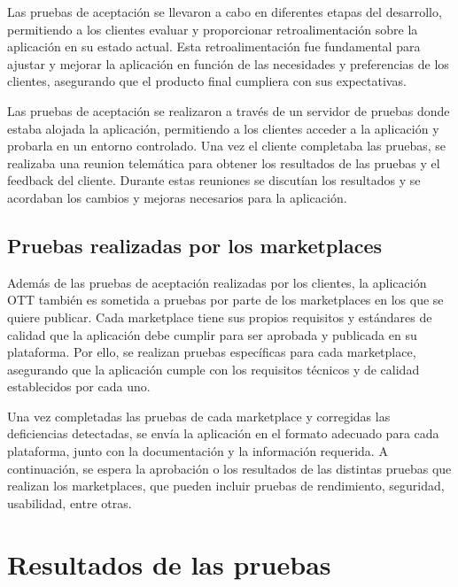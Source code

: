 Las pruebas de aceptación se llevaron a cabo en diferentes etapas del desarrollo, permitiendo a los clientes evaluar y
proporcionar retroalimentación sobre la aplicación en su estado actual. Esta retroalimentación fue fundamental para
ajustar y mejorar la aplicación en función de las necesidades y preferencias de los clientes, asegurando que el producto
final cumpliera con sus expectativas. 

Las pruebas de aceptación se realizaron a través de un servidor de pruebas donde estaba alojada la aplicación, permitiendo
a los clientes acceder a la aplicación y probarla en un entorno controlado. Una vez el cliente completaba las pruebas, se
realizaba una reunion telemática para obtener los resultados de las pruebas y el feedback del cliente. Durante estas reuniones
se discutían los resultados y se acordaban los cambios y mejoras necesarios para la aplicación.

\subsection{Pruebas realizadas por los marketplaces}
\label{subsec:pruebas_marketplaces}

Además de las pruebas de aceptación realizadas por los clientes, la aplicación OTT también es sometida a pruebas por parte
de los marketplaces en los que se quiere publicar. Cada marketplace tiene sus propios requisitos y estándares de calidad que la
aplicación debe cumplir para ser aprobada y publicada en su plataforma. Por ello, se realizan pruebas específicas para
cada marketplace, asegurando que la aplicación cumple con los requisitos técnicos y de calidad establecidos por cada uno.

Una vez completadas las pruebas de cada marketplace y corregidas las deficiencias detectadas, se envía la aplicación en el formato
adecuado para cada plataforma, junto con la documentación y la información requerida. A continuación, se espera la aprobación o los 
resultados de las distintas pruebas que realizan los marketplaces, que pueden incluir pruebas de rendimiento, seguridad, usabilidad,
entre otras.

\section{Resultados de las pruebas}
\label{sec:resultados_pruebas}

